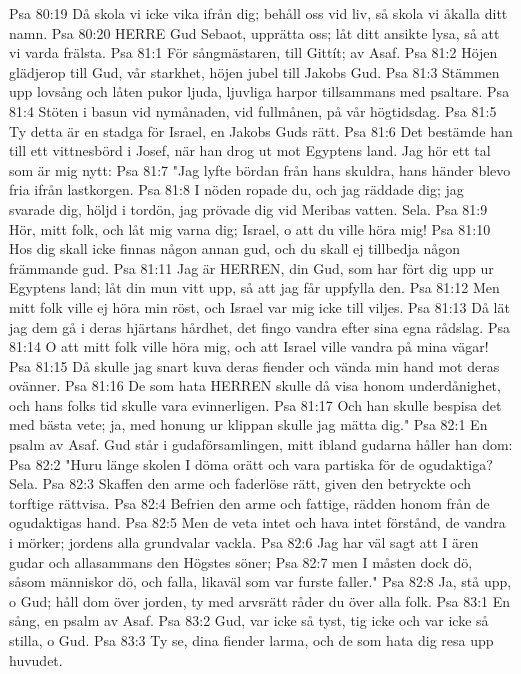 Psa 80:19  Då skola vi icke vika ifrån dig; behåll oss vid liv, så skola vi åkalla ditt namn.
Psa 80:20  HERRE Gud Sebaot, upprätta oss; låt ditt ansikte lysa, så att vi varda frälsta.
Psa 81:1  För sångmästaren, till Gittít; av Asaf.
Psa 81:2  Höjen glädjerop till Gud, vår starkhet, höjen jubel till Jakobs Gud.
Psa 81:3  Stämmen upp lovsång och låten pukor ljuda, ljuvliga harpor tillsammans med psaltare.
Psa 81:4  Stöten i basun vid nymånaden, vid fullmånen, på vår högtidsdag.
Psa 81:5  Ty detta är en stadga för Israel, en Jakobs Guds rätt.
Psa 81:6  Det bestämde han till ett vittnesbörd i Josef, när han drog ut mot Egyptens land. Jag hör ett tal som är mig nytt:
Psa 81:7  "Jag lyfte bördan från hans skuldra, hans händer blevo fria ifrån lastkorgen.
Psa 81:8  I nöden ropade du, och jag räddade dig; jag svarade dig, höljd i tordön, jag prövade dig vid Meribas vatten. Sela.
Psa 81:9  Hör, mitt folk, och låt mig varna dig; Israel, o att du ville höra mig!
Psa 81:10  Hos dig skall icke finnas någon annan gud, och du skall ej tillbedja någon främmande gud.
Psa 81:11  Jag är HERREN, din Gud, som har fört dig upp ur Egyptens land; låt din mun vitt upp, så att jag får uppfylla den.
Psa 81:12  Men mitt folk ville ej höra min röst, och Israel var mig icke till viljes.
Psa 81:13  Då lät jag dem gå i deras hjärtans hårdhet, det fingo vandra efter sina egna rådslag.
Psa 81:14  O att mitt folk ville höra mig, och att Israel ville vandra på mina vägar!
Psa 81:15  Då skulle jag snart kuva deras fiender och vända min hand mot deras ovänner.
Psa 81:16  De som hata HERREN skulle då visa honom underdånighet, och hans folks tid skulle vara evinnerligen.
Psa 81:17  Och han skulle bespisa det med bästa vete; ja, med honung ur klippan skulle jag mätta dig."
Psa 82:1  En psalm av Asaf. Gud står i gudaförsamlingen, mitt ibland gudarna håller han dom:
Psa 82:2  "Huru länge skolen I döma orätt och vara partiska för de ogudaktiga? Sela.
Psa 82:3  Skaffen den arme och faderlöse rätt, given den betryckte och torftige rättvisa.
Psa 82:4  Befrien den arme och fattige, rädden honom från de ogudaktigas hand.
Psa 82:5  Men de veta intet och hava intet förstånd, de vandra i mörker; jordens alla grundvalar vackla.
Psa 82:6  Jag har väl sagt att I ären gudar och allasammans den Högstes söner;
Psa 82:7  men I måsten dock dö, såsom människor dö, och falla, likaväl som var furste faller."
Psa 82:8  Ja, stå upp, o Gud; håll dom över jorden, ty med arvsrätt råder du över alla folk.
Psa 83:1  En sång, en psalm av Asaf.
Psa 83:2  Gud, var icke så tyst, tig icke och var icke så stilla, o Gud.
Psa 83:3  Ty se, dina fiender larma, och de som hata dig resa upp huvudet.
